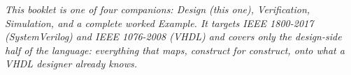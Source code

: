 \cleardoublepage
\thispagestyle{empty}
\vspace*{\fill}
\begin{center}
\begin{minipage}{0.78\textwidth}
\small\itshape
This booklet is one of four companions: Design (this one), Verification,
Simulation, and a complete worked Example. It targets IEEE 1800-2017
(SystemVerilog) and IEEE 1076-2008 (VHDL) and covers only the design-side
half of the language: everything that maps, construct for construct, onto
what a VHDL designer already knows.
\end{minipage}
\end{center}
\vspace*{\fill}
\cleardoublepage

